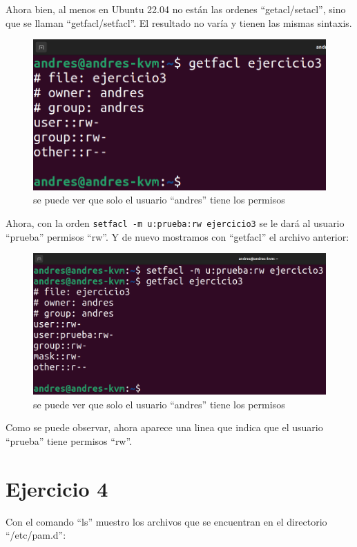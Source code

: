 \documentclass{article}
\begin{document}
Ahora bien, al menos en Ubuntu 22.04 no están las ordenes ``getacl/setacl'', sino que se llaman ``getfacl/setfacl''. El resultado no varía y tienen las mismas sintaxis.

\begin{figure}[H]
    \includegraphics[width=\textwidth]{imagenes/getfaclorg.png}
    \caption{se puede ver que solo el usuario ``andres'' tiene los permisos}
\end{figure}


Ahora, con la orden \verb|setfacl -m u:prueba:rw ejercicio3| se le dará al usuario ``prueba'' permisos ``rw''. Y de nuevo mostramos con ``getfacl'' el archivo anterior:

\begin{figure}[H]
    \includegraphics[width=\textwidth]{imagenes/getfaclnew.png}
    \caption{se puede ver que solo el usuario ``andres'' tiene los permisos}
\end{figure}

Como se puede observar, ahora aparece una linea que indica que el usuario ``prueba'' tiene permisos ``rw''.


\section{Ejercicio 4}
Con el comando ``ls'' muestro los archivos que se encuentran en el directorio ``/etc/pam.d'':
\end{document}
